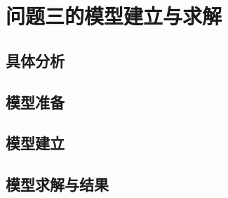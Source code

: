 \clearpage
\section{问题三的模型建立与求解}
\subsection{具体分析}
\subsection{模型准备}
\subsection{模型建立}
\subsection{模型求解与结果}
